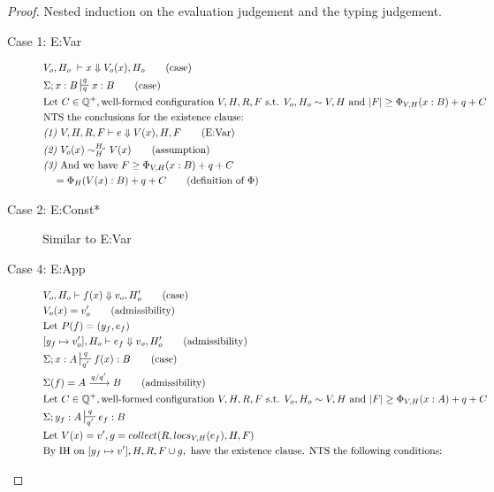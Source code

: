 \documentclass{easychair}
\newcommand{\veq}[4]{#3 \sim^{#1}_{#2} #4}
\theoremstyle{definition}
\begin{document}
\begin{proof}
Nested induction on the evaluation judgement and the typing judgement.\\
\begin{description}
  \item[Case 1: E:Var]
  \begin{align*}
  &V_o,H_o \; \vdash x \Downarrow V_o(x),H_o \tag{case}\\
  &\Sigma; x : B \sststile{q}{q} x : B \tag{case}\\
		&\text{Let } C \in \mathbb{Q}^+, \text{well-formed configuration } V,H,R,F \text{ s.t. }
		V_o,H_o \sim V,H
			\text{ and }|F| \ge \Phi_{V,H}(x : B) + q + C\\
		&\text{NTS the conclusions for the existence clause: }\\
		&\emph{(1) }V,H,R,F \vdash e \Downarrow V(x),H,F \tag{E:Var}\\
		&\emph{(2) }\veq{H_o}{H}{V_o(x)}{V(x)} \tag{assumption}\\
		&\emph{(3) }\text{And we have } F \ge \Phi_{V,H}(x : B) + q + C\\
	&\quad = \Phi_{H}(V(x) : B) + q + C \tag{definition of $\Phi$}\\
  \end{align*}
  \item[Case 2: E:Const*] Similar to E:Var
  \item[Case 4: E:App]
		\begin{align*}
			&V_o,H_o \vdash f(x) \Downarrow v_o,H_o' \tag{case}\\
			&V_o(x) = v_o' \tag{admissibility}\\
			&\text{Let } P(f) = (y_f,e_f)\\
			&[y_f \mapsto v_o'],H_o \vdash e_f \Downarrow v_o,H_o' \tag{admissibility}\\
			&\Sigma; x : A \sststile{q'}{q} f(x) : B \tag{case}\\
			&\Sigma(f) = A \xrightarrow{q/q'} B \tag{admissibility}\\
		&\text{Let } C \in \mathbb{Q}^+, \text{well-formed configuration } V,H,R,F \text{ s.t. }
		V_o,H_o \sim V,H
			\text{ and }|F| \ge \Phi_{V,H}(x : A) + q + C\\
			&\Sigma; y_f : A \sststile{q'}{q} e_f : B \\
			&\text{Let } V(x) = v', g = collect(R,locs_{V,H}(e_f),H,F)\\
			&\text{By IH on } [y_f \mapsto v'],H,R,F\cup g, \text{ have the  existence clause. NTS the
				following conditions: }\\

\end{align*}
\end{description}
\end{proof}
\end{document}
